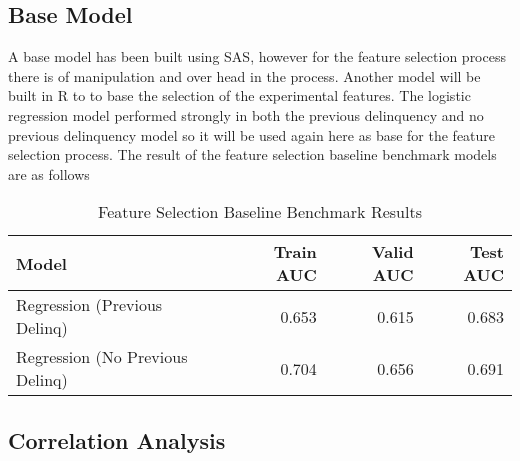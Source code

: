 \subsection{Base Model}
A base model has been built using SAS, however for the feature selection process there is of manipulation and over head in the process. Another model will be built in R to to base the selection of the experimental features. The logistic regression model performed strongly in both the previous delinquency and no previous delinquency model so it will be used again here as base for the feature selection process. The result of the feature selection baseline benchmark models are as follows 

\begin{table}[H]
	\centering
	\begin{tabular}{l | r | r| r}
		\hline
		\textbf{Model} & \textbf{Train AUC} & \textbf{Valid AUC} &  \textbf{Test AUC} \\
		\hline
		Regression (Previous Delinq) & 0.653 & 0.615 & 0.683  \\
		Regression (No Previous Delinq) & 0.704 & 0.656 & 0.691  \\
		\hline
	\end{tabular}
	\caption{Feature Selection Baseline Benchmark Results}
	\label{table:featureselection_base_model}
\end{table}

\subsection{Correlation Analysis}




